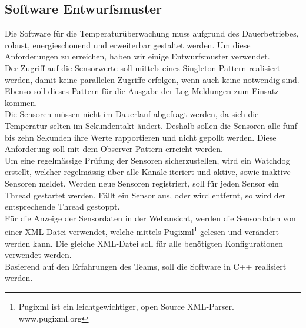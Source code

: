 \subsection{Software Entwurfsmuster}
Die Software für die Temperaturüberwachung muss aufgrund des Dauerbetriebes, robust, energieschonend und erweiterbar gestaltet werden. Um diese Anforderungen zu erreichen, haben wir einige Entwurfsmuster verwendet.\\
Der Zugriff auf die Sensorwerte soll mittels eines Singleton-Pattern realisiert werden, damit keine parallelen Zugriffe erfolgen, wenn auch keine notwendig sind. Ebenso soll dieses Pattern für die Ausgabe der Log-Meldungen zum Einsatz kommen.\\
Die Sensoren müssen nicht im Dauerlauf abgefragt werden, da sich die Temperatur selten im Sekundentakt ändert. Deshalb sollen die Sensoren alle fünf bis zehn Sekunden ihre Werte rapportieren und nicht gepollt werden. Diese Anforderung soll mit dem Observer-Pattern erreicht werden.\\
Um eine regelmässige Prüfung der Sensoren sicherzustellen, wird ein Watchdog erstellt, welcher regelmässig über alle Kanäle iteriert und aktive, sowie inaktive Sensoren meldet. Werden neue Sensoren registriert, soll für jeden Sensor ein Thread gestartet werden. Fällt ein Sensor aus, oder wird entfernt, so wird der entsprechende Thread gestoppt.\\
Für die Anzeige der Sensordaten in der Webansicht, werden die Sensordaten von einer XML-Datei verwendet, welche mittels Pugixml\footnote{Pugixml ist ein leichtgewichtiger, open Source XML-Parser. www.pugixml.org} gelesen und verändert werden kann. Die gleiche XML-Datei soll für alle benötigten Konfigurationen verwendet werden.\\
Basierend auf den Erfahrungen des Teams, soll die Software in C++ realisiert werden.
